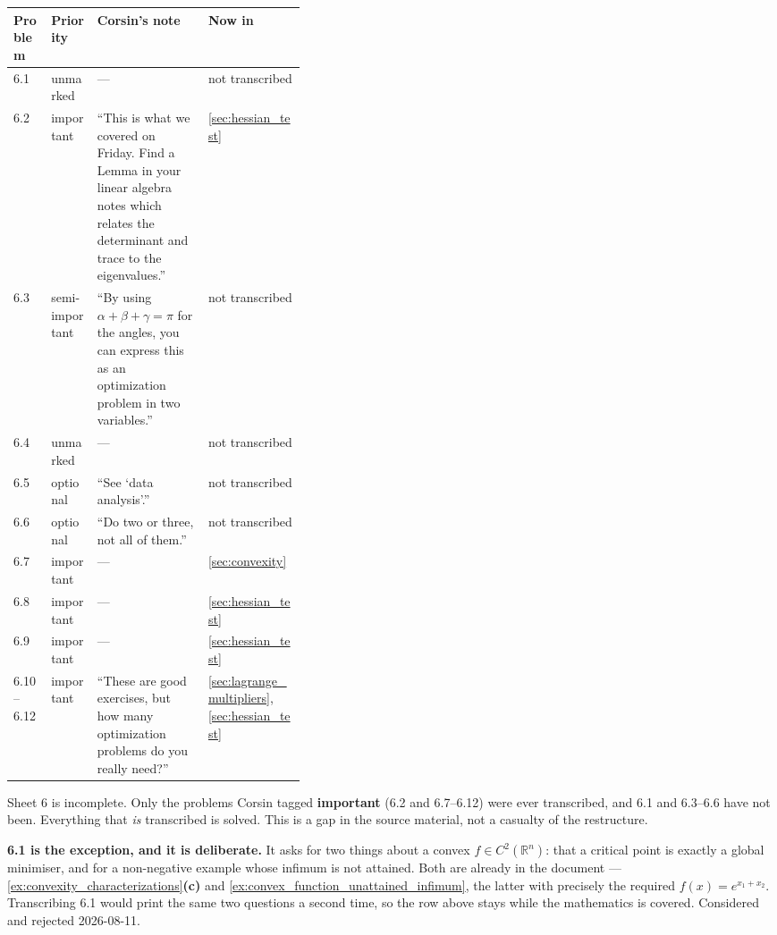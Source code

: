 \begin{center}
\begin{tabular}{@{}l l p{0.38\linewidth} l@{}}
\textbf{Problem} & \textbf{Priority} & \textbf{Corsin's note} & \textbf{Now in} \\
\hline
6.1 & unmarked & --- & not transcribed \\[3pt]
6.2 & important & ``This is what we covered on Friday. Find a Lemma in your linear algebra
  notes which relates the determinant and trace to the eigenvalues.'' & \cref{sec:hessian_test} \\[3pt]
6.3 & semi-important & ``By using $\alpha+\beta+\gamma=\pi$ for the angles, you can express
  this as an optimization problem in two variables.'' & not transcribed \\[3pt]
6.4 & unmarked & --- & not transcribed \\[3pt]
6.5 & optional & ``See `data analysis'.'' & not transcribed \\[3pt]
6.6 & optional & ``Do two or three, not all of them.'' & not transcribed \\[3pt]
6.7 & important & --- & \cref{sec:convexity} \\[3pt]
6.8 & important & --- & \cref{sec:hessian_test} \\[3pt]
6.9 & important & --- & \cref{sec:hessian_test} \\[3pt]
6.10--6.12 & important & ``These are good exercises, but how many optimization problems do
  you really need?'' & \cref{sec:lagrange_multipliers}, \cref{sec:hessian_test} \\
\end{tabular}
\end{center}

\begin{ainote}
Sheet 6 is incomplete. Only the problems Corsin tagged \textbf{important} (6.2 and 6.7--6.12)
were ever transcribed, and 6.1 and 6.3--6.6 have not been. Everything that \emph{is} transcribed
is solved. This is a gap in the source material, not a casualty of the restructure.

\textbf{6.1 is the exception, and it is deliberate.} It asks for two things about a convex
$f \in C^2(\mathbb{R}^n)$: that a critical point is exactly a global minimiser, and for a
non-negative example whose infimum is not attained. Both are already in the document ---
\cref{ex:convexity_characterizations}\textbf{(c)} and
\cref{ex:convex_function_unattained_infimum}, the latter with precisely the required
$f(x) = e^{x_1+x_2}$. Transcribing 6.1 would print the same two questions a second time, so the
row above stays  while the mathematics is covered. Considered and rejected
2026-08-11.
\end{ainote}

